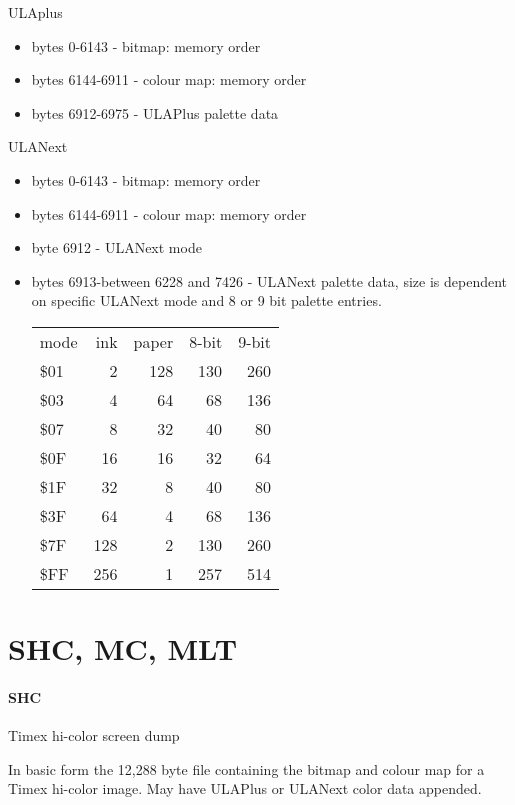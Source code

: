 ULAplus
\begin{itemize}
\item bytes 0-6143 - bitmap: memory order
\item bytes 6144-6911 - colour map: memory order
\item bytes 6912-6975 - ULAPlus palette data
\end{itemize}
ULANext
\begin{itemize}
\item bytes 0-6143 - bitmap: memory order
\item bytes 6144-6911 - colour map: memory order
\item byte 6912 - ULANext mode
\item bytes 6913-between 6228 and 7426 - ULANext palette data, size is
  dependent on specific ULANext mode and 8 or 9 bit palette entries.
  \begin{tabular}{l | r | r | r | r}
    mode & ink & paper & 8-bit & 9-bit \\
    \$01 & 2 & 128 & 130 & 260\\
    \$03 & 4 & 64 & 68 & 136\\
    \$07 & 8 & 32 & 40 & 80\\
    \$0F & 16 & 16 & 32 & 64\\
    \$1F & 32 & 8 & 40 & 80\\
    \$3F & 64 & 4 & 68 & 136\\
    \$7F & 128 & 2 & 130 & 260\\
    \$FF & 256 & 1 & 257 & 514
  \end{tabular}
\end{itemize}
\section{SHC, MC, MLT}
\paragraph{SHC}
Timex hi-color screen dump

In basic form the 12,288 byte file containing the bitmap and colour
map for a Timex hi-color image. May have ULAPlus or ULANext color data
appended.

